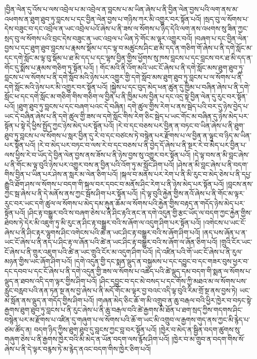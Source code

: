 །བྱིན་ལེན་དུ་འོས་པ་ལས་འབྲེལ་པ་མ་འབྲེལ་ན་བླངས་པ་མ་ཡིན་ཞེས་པ་ནི་བྱིན་ལེན་བྱས་པའི་ལག་ནས་མ་འཕགས་ན་ཐུག་ཐུབ་ཏུ་བླངས་པ་དང་བྱིན་ལེན་བྱས་པ་གཉིས་ཀར་མི་འགྱུར་བར་སྟོན་པའོ། །སྲད་བུ་ལ་སོགས་པ་དེས་བཟུང་བ་དང་འབྲེལ་ན་ཡང་འབྲེལ་པའོ་ཞེས་པ་ནི་ཟས་ལ་སོགས་པ་ཉིད་དེའི་ལག་ནས་འཕགས་སུ་ཟིན་ཀྱང་སྲད་བུ་ལ་སོགས་པའི་བྲང་དེས་བཟུང་ན་ཡང་འབྲལ་པ་ཡིན་ཏེ་གོང་མ་ལྟར་འགྱུར་བའོ། །བཞག་པ་དང་བྱིན་ལེན་བྱས་པ་དང་ཐུག་ཐུབ་བླངས་པ་རྣམས་སྡོམ་པ་དང་ལྟ་བ་མཚུངས་ཤིང་ཐ་མི་དད་ན་གཅིག་གོ་ཞེས་པ་ནི་དགེ་སློང་མ་དང་དགེ་སློང་མ་ལྟ་བུ་སྡོམ་པ་ཐ་མི་དད་པ་དང་ལྷས་བྱིན་གྱིས་ཕྱོགས་སུ་ཁས་བླངས་པ་དང་བླངས་བར་ཐ་མི་དད་ན་གོང་དུ་སྨོས་པ་རྣམས་གཅིག་ཏུ་སྟོན་པའོ། །
གོང་མའི་ནི་འོག་མའི་ཡང་ངོ་ཞེས་པ་ནི་དགེ་སློང་མས་ཐུག་ཐུབ་ཏུ་བླངས་པ་ལ་སོགས་པ་ནི་དགེ་སློབ་མའི་ཉེས་པར་འགྱུར་གྱི་དགེ་སློབ་མས་ཐུག་ཐུབ་ཏུ་བླངས་པ་ལ་སོགས་པ་ནི་དགེ་སློང་མའི་ཉེས་པར་མི་འགྱུར་བར་སྟོན་པའོ། །སྐྱེས་པ་དང་བུད་མེད་ཕན་ཚུན་དུ་ཁྱིམ་པ་བཞིན་ཞེས་པ་ནི་དགེ་སློང་ཕ་དང་དགེ་སློང་མ་གཅིག་གིས་གཅིག་ལ་བྱིན་པ་ནི་ཁྱིམ་པས་བྱིན་པ་དང་འདྲ་སྟེ་བྱིན་ལེན་དུ་རུང་བར་སྟོན་པའོ། །ཐུག་ཐུབ་ཏུ་བླངས་པ་དང་བཞག་པའང་དེ་བཞིན། དགེ་ཚུལ་གྱིས་རེག་པ་ནས་སྦེད་པའི་བར་དུ་ཉེས་བྱེད་པ་ཡང་དེ་བཞིན་ཞེས་པ་ནི་དགེ་ཚུལ་གྱི་ཟས་ལ་དགེ་སློང་གིས་རེག་ཅིང་སྦེད་པ་ཡང་གོང་མ་བཞིན་དུ་ཉེས་མེད་པར་སྟོན་པ་སྟེ་དེ་ཕྱིས་སྤྱོད་ཀྱང་ཉེས་མེད་པར་སྟོན་པའོ། །རེ་བ་དང་བཅས་པར་བྱིན་ན་བཏང་བ་ཡིན་ཞེས་པ་ནི་ཐུག་ཐུབ་ཏུ་བླངས་པ་ལ་སོགས་པ་སླར་བྱིན་དུ་རེ་བ་དང་བཙངས་ཏེ་བསྙེན་པར་རྫོགས་པ་ལ་བྱིན་ན་ལྟུང་བ་ཉིད་མ་ཡིན་པར་སྟོན་པའོ། །རེ་བ་མེད་པར་བཏང་བ་ལས་རེ་བ་དང་བཅས་པ་ནི་བྱེད་དོ་ཞེས་པ་ནི་སྔར་རེ་བ་མེད་པར་བྱིན་པ་ལས་ཕྱིས་རེ་བ་ཡོད་དེ་བྱིན་ལེན་བྱས་ནས་ཟོས་པ་ནི་ཉེས་བྱས་སུ་འགྱུར་བར་སྟོན་པའོ། །དེ་ལྟ་བས་ན་མི་བླང་ཞེས་པ་ནི་གོང་མ་ལྟ་བུའི་ཉེས་པར་འགྱུར་བས་ན་བྱིན་པའི་འོག་ཏུ་མ་སློང་ཤིག་པའོ། །ཤེས་ན་མི་བླང་ཞེས་པ་ནི་བདག་གིས་བྱིན་པ་ཡིན་པར་ཤེས་ན་སླར་མ་ལེན་ཅིག་པའོ། །སྐལ་བ་མནོས་པར་རེག་པ་ནི་མི་རུང་བ་མེད་ཅེས་པ་ནི་དཔྱ་རྒྱུའི་ཐོག་ཤས་ལ་སོགས་པ་བདག་གི་སྐལ་བར་དབང་བ་མནོས་ཤིང་རེག་པ་ནི་ཉེས་མེད་པར་སྟོན་པའོ། །བླངས་ནས་ཀྱང་སྦ་ཞེས་པ་ནི་དེ་མནོས་ནས་ཀྱང་སྦོས་ཤིག་པར་སྟོན་པའོ། །དེ་ལྟ་བུའི་རྐྱེན་གྱིས་ནའོ་ཞེས་པ་ནི་གོང་མ་ལྟར་རུང་བར་ཡང་དགེ་ཚུལ་ལ་སོགས་པ་མེད་དམ་རྐུན་ཆོམ་ལ་སོགས་པའི་རྐྱེན་གྱིས་བརྟད་ན་གདོད་ཉེས་མེད་པར་སྟོན་པའོ། །ཤིང་རྟ་བསྒྱུར་བའི་ས་བཞག་ཅེས་པ་ནི་ཤིང་རྟའི་ནང་ན་དགེ་འདུན་གྱི་རྩང་ཡོད་ལ་བདག་ཀྱང་རྐྱེན་གྱིས་ཐེབས་ཏེ་དེར་མི་འཇུག་ཏུ་མི་རུང་ན་ཤིང་རྟ་བསྒྱུར་བའི་ས་ཞོག་ལ་འདུག་ཤིག་པར་སྟོན་པའོ། །འགེངས་པ་ཡང་ངོ་ཞེས་པ་ནི་ཤིང་རྟར་ལྷུགས་ཤིང་འགེངས་པའི་ཚེ་ན་ཡང་ཤིང་རྟ་བསྒྱུར་བའི་ས་ཞོག་ཤིག་པའོ། །ནད་པས་ཞོན་པ་ན་ཡང་ངོ་ཞེས་པ་ནི་ནད་པ་ཤིང་རྟ་ལ་ཞོན་པའི་ཚེ་ན་ཡང་ཤིང་རྟ་བསྒྱུར་བའི་ས་ཞོག་ལ་ཞོན་ཅིག་པའོ། །གྲུའི་ངོར་ཡང་ངོ་ཞེས་པ་ནི་གྲུར་འཇུག་པའི་ཚེ་ན་ཡང་གྲུའི་ངོར་མ་འདུག་ཤིག་པའོ། །དེ་འཛིན་པའི་གོ་ཡང་ངོ་ཞེས་པ་ནི་རུལ་མཉན་གྱིས་ཡང་ཞོག་ཤིག་པའོ། །དགེ་འདུན་གྱི་དང་སྨན་ལྡུད་ན་བསྐྱམས་པ་དང་དབྱུང་བ་དང་གཟར་བུས་ཕྱར་བ་དང་དབབ་པ་དང་ངོ་ཞེས་པ་ནི་དགེ་འདུན་གྱི་ཟས་ལ་སོགས་པ་འཚེད་པའི་ཚེ་ལྡུད་དམ་བདག་གི་སྨན་ལ་སོགས་པ་ལྡུད་ན་ཐབས་འདི་དག་ལྟར་གྱིས་ཤིག་པའོ། །ཤིང་དབྱུང་བ་དང་མེ་བསད་པ་དང་གོས་ཀྱི་མཐའ་མ་ལ་སོགས་པས་རླུང་བརླབ་པའི་ནན་ཏན་སྔ་ནས་བྱ་ཞེས་པ་ནི་མདོ་གོང་མ་ལྟར་བྱ་བའང་འདི་ལྟ་བུའི་རིམ་གྲོ་སྔ་ནས་བྱས་ཏེ། ཡང་མ་སློན་ནས་ལྡུད་ན་གདོད་གྱིས་ཤིག་པའོ། །གཞན་མེད་ཅིང་ཆོ་ག་མི་འགྲུབ་ན་ཆུ་བརྒལ་བའི་ཕྱིར་ཁྱེར་བ་བཏང་སྟེ་རྒྱགས་ཐུག་ཐུབ་ཏུ་བླངས་པ་ནི་རུང་ཞེས་པ་ནི་ཆུ་བརྒལ་བའི་ཚེ་རྒྱགས་མི་ཐོན་པ་ཐག་སྲད་ཀྱིས་གདགས་ཤིང་བསྙེན་པར་མ་རྫོགས་པ་འཛིན་དུ་གཞུག་པ་ལ་སོགས་པའི་ཆོ་ག་ཡང་མི་འགྲུབ་ལ་རྒྱགས་གུད་ནས་ཀྱང་མི་རྙེད་པ་ཙམ་ཚོད་ན། བདག་ཉིད་ཀྱིས་ཐུག་ཐུབ་དུ་བླངས་ཀྱང་བླ་བར་སྟོན་པའོ། །ཁྱེར་བ་མེད་ན་སྦྱིན་བདག་ཚུགས་སུ་གཞུག་ཅེས་པ་ནི་རྒྱགས་ཁྱེར་བའི་མི་མེད་ན་ཡོན་བདག་ལས་རྙོས་ཤིག་པའོ། །ཁྱེར་བ་མ་གྲུབ་ན་བདག་གིས་སོ་ཞེས་པ་ནི་དེ་ལྟར་བརྙས་ཏེ་མ་རྙེད་ནའང་བདག་གིས་ཁྱེར་ཅིག་པའོ། 